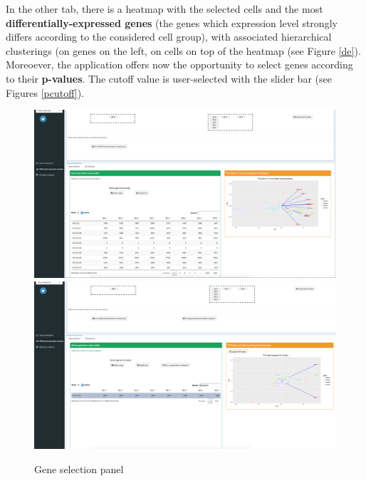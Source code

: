 \documentclass{report}
\begin{document}
{In the other tab, there is a heatmap with the selected cells and the most \textbf{differentially-expressed genes} (the genes which expression level strongly differs according to the considered cell group), with associated hierarchical clusterings (on genes on the left, on cells on top of the heatmap (see Figure \ref{de}).\\

Moreoever, the application offers now the opportunity to select genes according to their \textbf{p-values}. The cutoff value is user-selected with the slider bar (see Figures \ref{pcutoff}).\\

\begin{figure}[H]
\centering
\subfigure\includegraphics[scale=0.2]{application/geneselection.png}
\subfigure\includegraphics[scale=0.2]{application/geneselected.png}
\caption{Gene selection panel}
\label{geneselection}
\end{figure}

}
\end{document}

